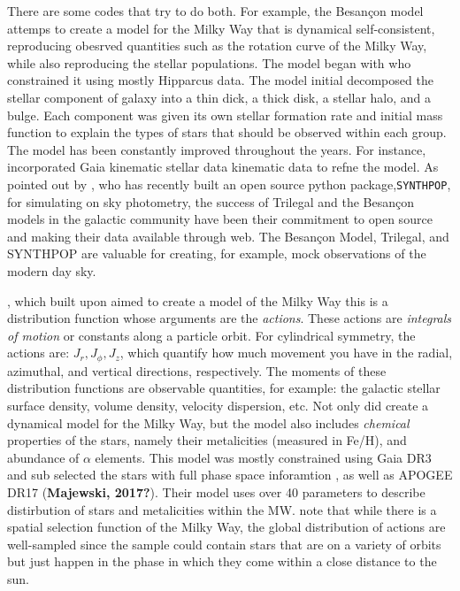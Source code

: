         There are some codes that try to do both. For example, the Besançon model attemps to create a model for the Milky Way that is dynamical self-consistent, reproducing obesrved quantities such as the rotation curve of the Milky Way, while also reproducing the stellar populations. The model began with \citet{2003A&A...409..523R} who constrained it using mostly Hipparcus data. The model initial decomposed the stellar component of galaxy into a thin dick, a thick disk, a stellar halo, and a bulge. Each component was given its own stellar formation rate and initial mass function to explain the types of stars that should be observed within each group. The model has been constantly improved throughout the years. For instance, \citet{2022A&A...667A..98R} incorporated Gaia kinematic stellar data kinematic data to refne the model. As pointed out by \citet{2025AJ....169..317K}, who has recently built an open source python package,\texttt{SYNTHPOP}, for simulating on sky photometry, the success of Trilegal and the Besançon models in the galactic community have been their commitment to open source and making their data available through web. The Besançon Model, Trilegal, and SYNTHPOP are valuable for creating, for example, mock observations of the modern day sky. 

        \citet{2024MNRAS.527.1915B}, which built upon \citet{2023MNRAS.520.1832B} aimed to create a model of the Milky Way this is a distribution function whose arguments are the \textit{actions}. These actions are \textit{integrals of motion} or constants along a particle orbit. For cylindrical symmetry, the actions are: $J_r, J_\phi, J_z$, which quantify how much movement you have in the radial, azimuthal, and vertical directions, respectively. The moments of these distribution functions are observable quantities, for example: the galactic stellar surface density, volume density, velocity dispersion, etc. Not only did \citet{2024MNRAS.527.1915B} create a dynamical model for the Milky Way, but the model also includes \textit{chemical} properties of the stars, namely their metalicities (measured in Fe/H), and abundance of $\alpha$ elements. This model was mostly constrained using Gaia DR3 and sub selected the stars with full phase space inforamtion \citep{2023A&A...674A...1G}, as well as APOGEE DR17 (\textbf{Majewski, 2017?}). Their model uses over 40 parameters to describe distirbution of stars and metalicities within the MW.  \citet{2023MNRAS.520.1832B} note that while there is a spatial selection function of the Milky Way, the global distribution of actions are well-sampled since the sample could contain stars that are on a variety of orbits but just happen in the phase in which they come within a close distance to the sun. 

